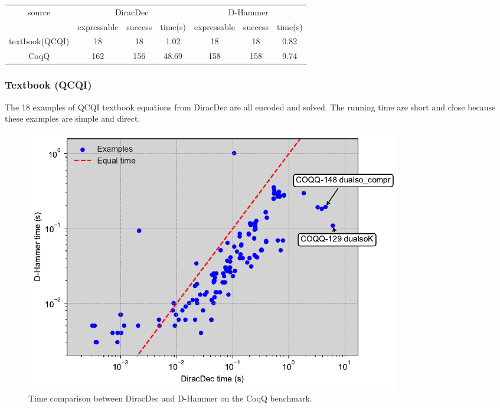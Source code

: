 \begin{center}
    \begin{tabular}{c|c c c|c c c}
        \hline
        \multirow{2}{*}{source} & \multicolumn{3}{c|}{DiracDec} & \multicolumn{3}{c}{D-Hammer} \\
        \cline{2-7}
                                 & expressable & success & time(s)           & expressable & success & time(s)                 \\
        \hline
        textbook(QCQI)          & 18          & 18        &    1.02        &    18      & 18          &   0.82      \\
        CoqQ                    & 162          & 156       &    48.69       &   158     &  158   &     9.74     \\
        \hline
    \end{tabular}        
\end{center}

\subsubsection{Textbook (QCQI)}
The 18 examples of QCQI textbook equations from DiracDec are all encoded and solved. The running time are short and close because these examples are simple and direct.


\begin{figure}[h]
    \centering
    \includegraphics[width=0.8\textwidth]{fig/coqq.pdf}
    \caption{Time comparison between DiracDec and D-Hammer on the CoqQ benchmark.}
    \label{fig: CoqQ plot}
\end{figure}

